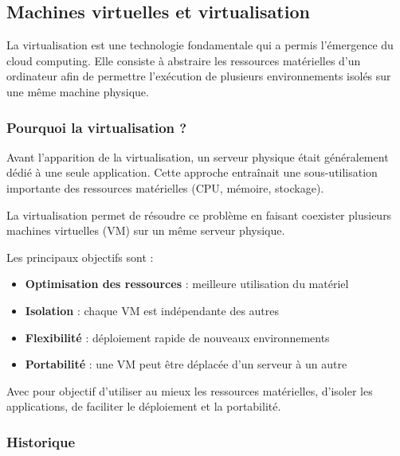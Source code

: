 \documentclass{rapportClass} %
\begin{document}
\subsection{Machines virtuelles et virtualisation}

La virtualisation est une technologie fondamentale qui a permis l’émergence du cloud computing. 
Elle consiste à abstraire les ressources matérielles d’un ordinateur afin de permettre l’exécution 
de plusieurs environnements isolés sur une même machine physique.

\subsubsection{Pourquoi la virtualisation ?}

Avant l’apparition de la virtualisation, un serveur physique était généralement dédié à une seule application. 
Cette approche entraînait une sous-utilisation importante des ressources matérielles (CPU, mémoire, stockage).

La virtualisation permet de résoudre ce problème en faisant coexister plusieurs machines virtuelles (VM) sur un même serveur physique.

Les principaux objectifs sont :
\begin{itemize}
\item \textbf{Optimisation des ressources} : meilleure utilisation du matériel
\item \textbf{Isolation} : chaque VM est indépendante des autres
\item \textbf{Flexibilité} : déploiement rapide de nouveaux environnements
\item \textbf{Portabilité} : une VM peut être déplacée d’un serveur à un autre
\end{itemize}

Avec pour objectif d'utiliser au mieux les ressources matérielles, d'isoler les applications, de faciliter le déploiement et la portabilité. 

\subsubsection{Historique}
\end{document}

